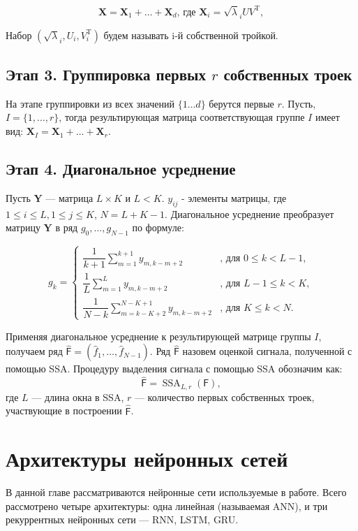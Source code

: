 \documentclass[specialist,
               substylefile = spbu.rtx,
               subf,href,colorlinks=true, 12p]{disser}
\DeclareMathOperator{\SSA}{SSA}
\begin{document}
$$\mathbf{X} = \mathbf{X}_1 + \dotsc + \mathbf{X}_d \text{, где } \mathbf{X}_i = \sqrt \lambda_i U V^\mathrm{T}, $$

Набор $(\sqrt \lambda_i, U_i, V^\mathrm{T}_i)$ будем называть i-й собственной тройкой.

\section{Этап 3. Группировка первых $r$ собственных троек}
На этапе группировки из всех значений $\{1 \dotsc d\}$ берутся первые $r$. Пусть, $I = \{1, \dotsc , r\}$, тогда результирующая матрица соответствующая группе $I$ имеет вид:
$\mathbf{X}_{I} = \mathbf{X}_{1} + \dotsc + \mathbf{X}_{r}$.

\section{Этап 4. Диагональное усреднение}
Пусть $\mathbf{Y}$ --- матрица $L \times K$ и $ L < K$. $y_{ij}$ - элементы матрицы, где $1 \leqslant i \leqslant L, 1 \leqslant j \leqslant K$,  $N = L + K - 1$.  Диагональное усреднение преобразует матрицу $\mathbf{Y}$ в ряд $g_0, \dotsc , g_{N-1}$ по формуле:

\begin{equation*}
	g_k =
	\begin{cases}
		\dfrac{1}{k+1} \sum \limits_{m=1}^{k+1} y_{m, k-m+2} &  \text{, для } 0 \leqslant k < L-1,\\
		\dfrac{1}{L} \sum \limits_{m=1}^L y_{m, k-m+2} &  \text{, для } L-1 \leqslant k < K,\\
		\dfrac{1}{N-k} \sum \limits_{m=k-K+2}^{N-K+1} y_{m, k-m+2} & \text{, для } K \leqslant k < N.
	\end{cases}
\end{equation*}

Применяя диагональное усреднение к результирующей матрице группы $I$, получаем ряд $\widehat{\mathsf{F}} = (\hat{f}_1, \ldots, \hat{f}_{N-1})$. Ряд $\widehat{\mathsf{F}}$ назовем оценкой сигнала, полученной с помощью SSA.
Процедуру выделения сигнала с помощью SSA обозначим как:
$$ \widehat{\mathsf{F}} = \SSA_{L, r}(\mathsf{F}), $$
где $L$ --- длина окна в SSA, $r$ --- количество первых собственных троек, участвующие в построении $\widehat{\mathsf{F}}$.

\chapter{Архитектуры нейронных сетей}
\label{models}
В данной главе рассматриваются нейронные сети используемые в работе. Всего рассмотрено четыре архитектуры: одна линейная (называемая ANN), и три рекуррентных нейронных сети --- RNN, LSTM, GRU.
\end{document}
